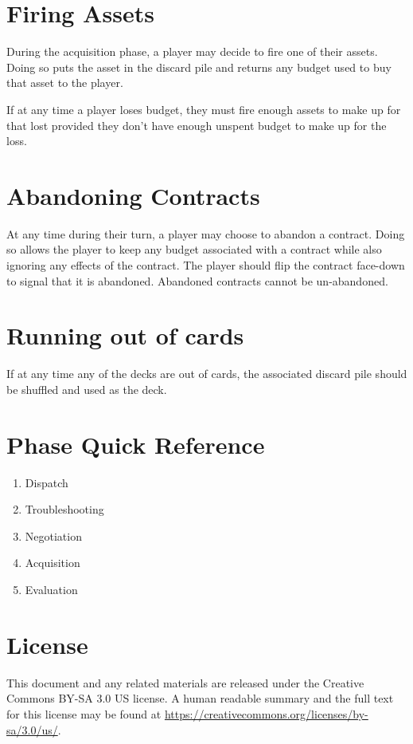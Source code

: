 \documentclass[twocolumn]{article}
\begin{document}
\section*{Firing Assets}

During the acquisition phase, a player may decide to fire one of their assets. Doing so puts the asset in the discard pile and returns any budget used to buy that asset to the player.

If at any time a player loses budget, they must fire enough assets to make up for that lost provided they don't have enough unspent budget to make up for the loss.

\section*{Abandoning Contracts}

At any time during their turn, a player may choose to abandon a contract. Doing so allows the player to keep any budget associated with a contract while also ignoring any effects of the contract. The player should flip the contract face-down to signal that it is abandoned. Abandoned contracts cannot be un-abandoned.

\section*{Running out of cards}

If at any time any of the decks are out of cards, the associated discard pile should be shuffled and used as the deck.

\pagebreak

\section*{Phase Quick Reference}

\begin{enumerate}
	\item Dispatch
	\item Troubleshooting
	\item Negotiation
	\item Acquisition
	\item Evaluation
\end{enumerate}

\section*{License}

This document and any related materials are released under the Creative Commons BY-SA 3.0 US license. A human readable summary and the full text for this license may be found at \url{https://creativecommons.org/licenses/by-sa/3.0/us/}.
\end{document}
